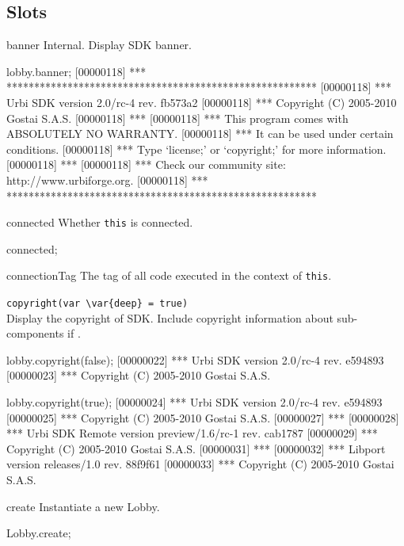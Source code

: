 \subsection{Slots}
\begin{urbiscriptapi}
\item[banner] Internal.  Display \urbi SDK banner.
\begin{urbiscript}
lobby.banner;
[00000118] *** ********************************************************
[00000118] *** Urbi SDK version 2.0/rc-4 rev. fb573a2
[00000118] *** Copyright (C) 2005-2010 Gostai S.A.S.
[00000118] ***
[00000118] *** This program comes with ABSOLUTELY NO WARRANTY.
[00000118] *** It can be used under certain conditions.
[00000118] *** Type `license;' or `copyright;' for more information.
[00000118] ***
[00000118] *** Check our community site: http://www.urbiforge.org.
[00000118] *** ********************************************************
\end{urbiscript}

\item[connected]
  Whether \lstinline|this| is connected.
\begin{urbiassert}
connected;
\end{urbiassert}

\item[connectionTag]
  The tag of all code executed in the context of \lstinline|this|.

\item \lstinline|copyright(var \var{deep} = true)|~\\
  Display the copyright of \urbi SDK.  Include copyright information
  about sub-components if .
\begin{urbiscript}
lobby.copyright(false);
[00000022] *** Urbi SDK version 2.0/rc-4 rev. e594893
[00000023] *** Copyright (C) 2005-2010 Gostai S.A.S.

lobby.copyright(true);
[00000024] *** Urbi SDK version 2.0/rc-4 rev. e594893
[00000025] *** Copyright (C) 2005-2010 Gostai S.A.S.
[00000027] ***
[00000028] *** Urbi SDK Remote version preview/1.6/rc-1 rev. cab1787
[00000029] *** Copyright (C) 2005-2010 Gostai S.A.S.
[00000031] ***
[00000032] *** Libport version releases/1.0 rev. 88f9f61
[00000033] *** Copyright (C) 2005-2010 Gostai S.A.S.
\end{urbiscript}

\item[create]
  Instantiate a new Lobby.
\begin{urbiassert}
Lobby.create;
\end{urbiassert}


\end{urbiscriptapi}
